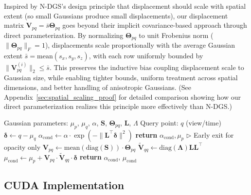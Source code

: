 \documentclass{article}
\newcommand{\return}{\textbf{return }}
\newcommand{\Comment}[1]{\hfill $\triangleright$ #1}
\theoremstyle{plain}
\theoremstyle{definition}
\theoremstyle{remark}
\begin{document}
Inspired by N-DGS's design principle that displacement should scale with spatial extent (so small Gaussians produce small displacements), our displacement matrix $\mathbf{V}_{pq} = \bar{s} \boldsymbol{\Theta}_{pq}$ goes beyond their implicit covariance-based approach through direct parameterization. By normalizing $\boldsymbol{\Theta}_{pq}$ to unit Frobenius norm ($\|\boldsymbol{\Theta}_{pq}\|_F = 1$), displacements scale proportionally with the average Gaussian extent $\bar{s} = \text{mean}(s_x, s_y, s_z)$, with each row uniformly bounded by $\|\mathbf{V}_{pq}^{(i)}\|_2 \leq \bar{s}$. This preserves the inductive bias coupling displacement scale to Gaussian size, while enabling tighter bounds, uniform treatment across spatial dimensions, and better handling of anisotropic Gaussians. (See Appendix~\ref{sec:spatial_scaling_proof} for detailed comparison showing how our direct parameterization realizes this principle more effectively than N-DGS.)


\begin{algorithm}[tb]
\caption{\textit{d}GS Conditional Gaussian Slicing}
\label{alg:slice}
\begin{algorithmic}[1]
\REQUIRE Gaussian parameters: $\mu_p$, $\mu_q$, $\alpha$, $\mathbf{S}$, $\boldsymbol{\Theta}_{pq}$, $\mathbf{L}$, $\Lambda$
\REQUIRE Query point: $q$ (view/time)
\STATE $\boldsymbol{\delta} \gets q - \mu_q$ %
\STATE $\alpha_{\text{cond}} \gets \alpha \cdot \exp(-\|\mathbf{L}^\top \boldsymbol{\delta}\|^2)$ %
    \STATE \return  $\alpha_{\text{cond}}, \mu_p$ \Comment{Early exit for opacity only}
\ENDIF
\STATE $\mathbf{V}_{pq} \gets \text{mean}(\text{diag}(\mathbf{S})) \cdot \boldsymbol{\Theta}_{pq}$ %
\STATE $\tilde{\mathbf{V}}_{qq} \gets \text{diag}(\boldsymbol{\Lambda}) \mathbf{L}\mathbf{L}^\top$ %
\STATE $\mu_{\text{cond}} \gets \mu_p + \mathbf{V}_{pq} \cdot \tilde{\mathbf{V}}_{qq} \cdot \boldsymbol{\delta}$ %
\STATE \return $\alpha_{\text{cond}}$, $\mu_{\text{cond}}$
\end{algorithmic}
\end{algorithm}
\setlength{\textfloatsep}{22pt}


\subsection{CUDA Implementation}
\end{document}
